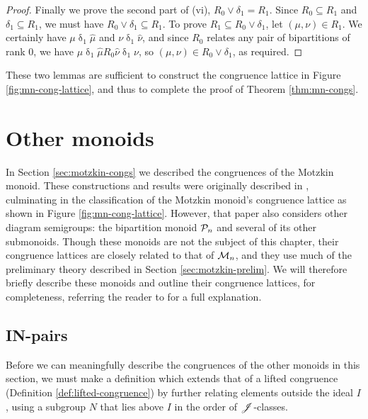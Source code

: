 \begin{lemma}
\begin{proof}
    Finally we prove the second part of (vi), $R_0 \vee \delta_1 = R_1$.  Since
    $R_0 \subseteq R_1$ and $\delta_1 \subseteq R_1$, we must have
    $R_0 \vee \delta_1 \subseteq R_1$.  To prove
    $R_1 \subseteq R_0 \vee \delta_1$, let $(\mu, \nu) \in R_1$.  We certainly
    have $\mu \mathrel\delta_1 \widehat\mu$ and
    $\nu \mathrel\delta_1 \widehat\nu$, and since $R_0$ relates any pair of
    bipartitions of rank $0$, we have
    $\mu \mathrel\delta_1 \widehat\mu \mathrel{R_0} \widehat\nu \mathrel\delta_1
    \nu$, so $(\mu, \nu) \in R_0 \vee \delta_1$, as required.
  \end{proof}
\end{lemma}

These two lemmas are sufficient to construct the congruence lattice in Figure
\ref{fig:mn-cong-lattice}, and thus to complete the proof of Theorem
\ref{thm:mn-congs}.

\section{Other monoids}
\label{sec:motzkin-other}
In Section \ref{sec:motzkin-congs} we described the congruences of the Motzkin
monoid.  These constructions and results were originally described in
\cite{ourpaper}, culminating in the classification of the Motzkin monoid's
congruence lattice as shown in Figure \ref{fig:mn-cong-lattice}.  However, that
paper also considers other diagram semigroups: the bipartition monoid $\mathcal{P}_n$
and several of its other submonoids.  Though these monoids are not the subject
of this chapter, their congruence lattices are closely related to that of
$\mathcal{M}_n$, and they use much of the preliminary theory described in Section
\ref{sec:motzkin-prelim}.  We will therefore briefly describe these monoids and
outline their congruence lattices, for completeness, referring the reader to
\cite{ourpaper} for a full explanation.

\subsection{IN-pairs}
\label{sec:in-pairs}
Before we can meaningfully describe the congruences of the other monoids in this
section, we must make a definition which extends that of a lifted congruence
(Definition \ref{def:lifted-congruence}) by further relating elements outside
the ideal $I$, using a subgroup $N$ that lies above $I$ in the order of
$\mathrel{\mathscr{J}}$-classes.

